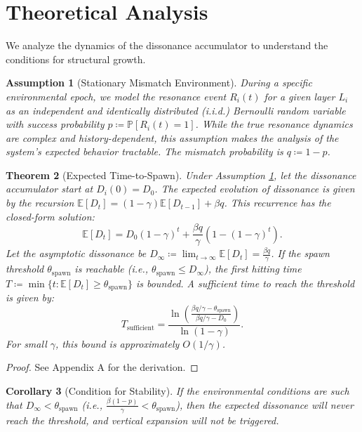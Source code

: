 \documentclass{article}
\newtheorem{theorem}{Theorem}[section]
\newtheorem{corollary}[theorem]{Corollary}
\newtheorem{assumption}[theorem]{Assumption}
\begin{document}
\section{Theoretical Analysis}
We analyze the dynamics of the dissonance accumulator to understand the conditions for structural growth.

\begin{assumption}[Stationary Mismatch Environment]
\label{ass:bernoulli}
During a specific environmental epoch, we model the resonance event $R_i(t)$ for a given layer $L_i$ as an independent and identically distributed (i.i.d.) Bernoulli random variable with success probability $p \coloneqq \mathbb{P}[R_i(t)=1]$. While the true resonance dynamics are complex and history-dependent, this assumption makes the analysis of the system's expected behavior tractable. The mismatch probability is $q \coloneqq 1-p$.
\end{assumption}

\begin{theorem}[Expected Time-to-Spawn]
\label{thm:spawn_time}
Under Assumption \ref{ass:bernoulli}, let the dissonance accumulator start at $D_i(0)=D_0$. The expected evolution of dissonance is given by the recursion $\mathbb{E}[D_t] = (1-\gamma)\mathbb{E}[D_{t-1}] + \beta q$. This recurrence has the closed-form solution:
\[
\mathbb{E}[D_t] = D_0(1-\gamma)^t + \frac{\beta q}{\gamma}\left(1-(1-\gamma)^t\right).
\]
Let the asymptotic dissonance be $D_\infty \coloneqq \lim_{t\to\infty} \mathbb{E}[D_t] = \frac{\beta q}{\gamma}$. If the spawn threshold $\theta_{\mathrm{spawn}}$ is reachable (i.e., $\theta_{\mathrm{spawn}} \le D_\infty$), the first hitting time $T \coloneqq \min\{t : \mathbb{E}[D_t] \ge \theta_{\mathrm{spawn}}\}$ is bounded. A sufficient time to reach the threshold is given by:
\[
T_{\mathrm{sufficient}} = \frac{\ln\left(\frac{\beta q/\gamma - \theta_{\mathrm{spawn}}}{\beta q/\gamma - D_0}\right)}{\ln(1-\gamma)}.
\]
For small $\gamma$, this bound is approximately $O(1/\gamma)$.
\end{theorem}
\begin{proof} See Appendix A for the derivation. \end{proof}

\begin{corollary}[Condition for Stability]
If the environmental conditions are such that $D_\infty < \theta_{\mathrm{spawn}}$ (i.e., $\frac{\beta(1-p)}{\gamma} < \theta_{\mathrm{spawn}}$), then the expected dissonance will never reach the threshold, and vertical expansion will not be triggered.
\end{corollary}
\end{document}
